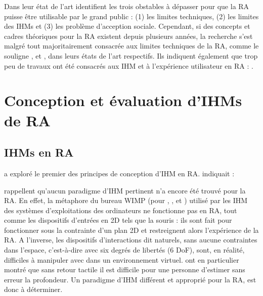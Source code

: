 



Dans leur état de l'art \cite{Azuma2001} identifient les trois obstables à dépasser pour que la RA puisse être utilisable par le grand public : (1) les limites techniques, (2) les limites des IHMs et (3) les problème d'acception sociale. Cependant, si des concepts et cadres théoriques pour la RA existent depuis plusieurs années, la recherche s'est malgré tout majoritairement consacrée aux limites techniques de la RA, comme le souligne \cite{Zhou2008}, \cite{VanKrevelen2010} et \cite{Billinghurst2015}, dans leurs états de l'art respectifs. Ils indiquent également que trop peu de travaux ont été consacrés aux IHM et à l'expérience utilisateur en RA :  \citep{Billinghurst2015}.


\section{Conception et évaluation d'IHMs de RA}
\subsection{IHMs en RA}
\cite{Billinghurst2005} a exploré le premier des principes de conception d'IHM en RA. indiquait : 

\citet{VanKrevelen2010} rappellent qu'aucun paradigme d'IHM pertinent n'a encore été trouvé pour la RA. En effet, la métaphore du bureau WIMP (pour , ,  et ) utilisé par les IHM des systèmes d'exploitations des ordinateurs ne fonctionne pas en RA, tout comme les dispositifs d'entrées en 2D tels que la souris : ils sont fait pour fonctionner sous la contrainte d'un plan 2D et restreignent alors l'expérience de la RA. \citep{VanKrevelen2010} A l'inverse, les dispositifs d'interactions dit naturels, sans aucune contraintes dans l'espace, c'est-à-dire avec six degrés de libertés (6 DoF), sont, en réalité, difficiles à manipuler avec dans un environnement virtuel. \citet{ChanKaoChenEtAl2010} ont en particulier montré que sans retour tactile il est difficile pour une personne d'estimer sans erreur la profondeur. Un paradigme d'IHM différent et approprié pour la RA, est donc à déterminer.


